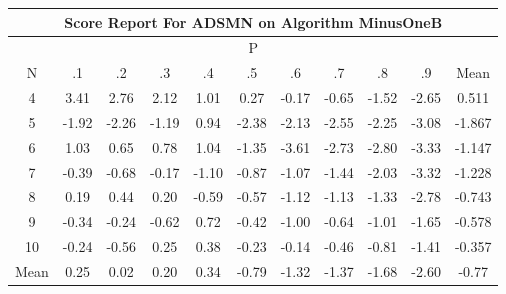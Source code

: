 \documentclass[11pt,a4paper]{report}
\begin{document}
\begin{longtable}{ | c || c | c | c | c | c | c | c | c | c || c |}
\hline
\multicolumn{11}{|c|}{ Score Report For ADSMN on Algorithm MinusOneB} \\
\hline
\multicolumn{11}{|c|}{ P } \\
\hline
N & .1 & .2 & .3 & .4 & .5 & .6 & .7 & .8 & .9 & Mean\\
 \hline
 \hline
 \endhead
  4 &  \cellcolor[HTML]{A7A7FF} 3.41 &  \cellcolor[HTML]{B7B7FF} 2.76 &  \cellcolor[HTML]{C7C7FF} 2.12 &  \cellcolor[HTML]{E7E7FF} 1.01 &  \cellcolor[HTML]{F7F7FF} 0.27 &  \cellcolor[HTML]{FFF7F7} -0.17 &  \cellcolor[HTML]{FFEFEF} -0.65 &  \cellcolor[HTML]{FFD7D7} -1.52 &  \cellcolor[HTML]{FFBFBF} -2.65 & 0.511 \\
  5 &  \cellcolor[HTML]{FFCFCF} -1.92 &  \cellcolor[HTML]{FFC7C7} -2.26 &  \cellcolor[HTML]{FFDFDF} -1.19 &  \cellcolor[HTML]{E7E7FF} 0.94 &  \cellcolor[HTML]{FFBFBF} -2.38 &  \cellcolor[HTML]{FFC7C7} -2.13 &  \cellcolor[HTML]{FFBFBF} -2.55 &  \cellcolor[HTML]{FFC7C7} -2.25 &  \cellcolor[HTML]{FFAFAF} -3.08 & -1.867 \\
  6 &  \cellcolor[HTML]{E7E7FF} 1.03 &  \cellcolor[HTML]{EFEFFF} 0.65 &  \cellcolor[HTML]{EFEFFF} 0.78 &  \cellcolor[HTML]{E7E7FF} 1.04 &  \cellcolor[HTML]{FFDFDF} -1.35 &  \cellcolor[HTML]{FFA7A7} -3.61 &  \cellcolor[HTML]{FFB7B7} -2.73 &  \cellcolor[HTML]{FFB7B7} -2.80 &  \cellcolor[HTML]{FFAFAF} -3.33 & -1.147 \\
  7 &  \cellcolor[HTML]{FFF7F7} -0.39 &  \cellcolor[HTML]{FFEFEF} -0.68 &  \cellcolor[HTML]{FFF7F7} -0.17 &  \cellcolor[HTML]{FFE7E7} -1.10 &  \cellcolor[HTML]{FFE7E7} -0.87 &  \cellcolor[HTML]{FFE7E7} -1.07 &  \cellcolor[HTML]{FFD7D7} -1.44 &  \cellcolor[HTML]{FFCFCF} -2.03 &  \cellcolor[HTML]{FFAFAF} -3.32 & -1.228 \\
  8 &  \cellcolor[HTML]{F7F7FF} 0.19 &  \cellcolor[HTML]{F7F7FF} 0.44 &  \cellcolor[HTML]{F7F7FF} 0.20 &  \cellcolor[HTML]{FFEFEF} -0.59 &  \cellcolor[HTML]{FFEFEF} -0.57 &  \cellcolor[HTML]{FFDFDF} -1.12 &  \cellcolor[HTML]{FFDFDF} -1.13 &  \cellcolor[HTML]{FFDFDF} -1.33 &  \cellcolor[HTML]{FFB7B7} -2.78 & -0.743 \\
  9 &  \cellcolor[HTML]{FFF7F7} -0.34 &  \cellcolor[HTML]{FFF7F7} -0.24 &  \cellcolor[HTML]{FFEFEF} -0.62 &  \cellcolor[HTML]{EFEFFF} 0.72 &  \cellcolor[HTML]{FFF7F7} -0.42 &  \cellcolor[HTML]{FFE7E7} -1.00 &  \cellcolor[HTML]{FFEFEF} -0.64 &  \cellcolor[HTML]{FFE7E7} -1.01 &  \cellcolor[HTML]{FFD7D7} -1.65 & -0.578 \\
  10 &  \cellcolor[HTML]{FFF7F7} -0.24 &  \cellcolor[HTML]{FFEFEF} -0.56 &  \cellcolor[HTML]{F7F7FF} 0.25 &  \cellcolor[HTML]{F7F7FF} 0.38 &  \cellcolor[HTML]{FFF7F7} -0.23 &  \cellcolor[HTML]{FFFFFF} -0.14 &  \cellcolor[HTML]{FFF7F7} -0.46 &  \cellcolor[HTML]{FFE7E7} -0.81 &  \cellcolor[HTML]{FFDFDF} -1.41 & -0.357 \\
 \hline
 \hline
Mean &  \cellcolor[HTML]{F7F7FF} 0.25 &  \cellcolor[HTML]{FFFFFF} 0.02 &  \cellcolor[HTML]{F7F7FF} 0.20 &  \cellcolor[HTML]{F7F7FF} 0.34 &  \cellcolor[HTML]{FFEFEF} -0.79 &  \cellcolor[HTML]{FFDFDF} -1.32 &  \cellcolor[HTML]{FFDFDF} -1.37 &  \cellcolor[HTML]{FFD7D7} -1.68 &  \cellcolor[HTML]{FFBFBF} -2.60 &  \cellcolor[HTML]{FFEFEF} -0.77
\end{longtable}
\end{document}
